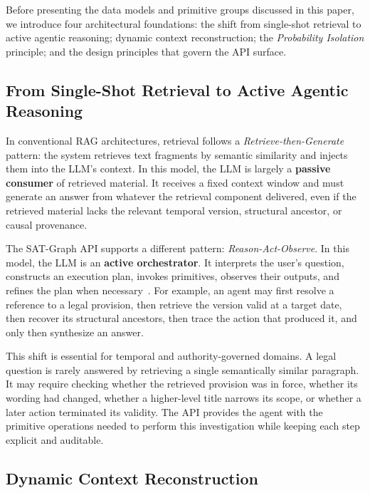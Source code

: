 \documentclass[11pt]{article}
\begin{document}
Before presenting the data models and primitive groups discussed in this paper, we introduce four architectural foundations: the shift from single-shot retrieval to active agentic reasoning; dynamic context reconstruction; the \textit{Probability Isolation} principle; and the design principles that govern the API surface.

\subsection{From Single-Shot Retrieval to Active Agentic Reasoning}
\label{subsec:paradigm_shift}

In conventional RAG architectures, retrieval follows a \textit{Retrieve-then-Generate} pattern: the system retrieves text fragments by semantic similarity and injects them into the LLM's context. In this model, the LLM is largely a \textbf{passive consumer} of retrieved material. It receives a fixed context window and must generate an answer from whatever the retrieval component delivered, even if the retrieved material lacks the relevant temporal version, structural ancestor, or causal provenance.

The SAT-Graph API supports a different pattern: \textit{Reason-Act-Observe}. In this model, the LLM is an \textbf{active orchestrator}. It interprets the user's question, constructs an execution plan, invokes primitives, observes their outputs, and refines the plan when necessary~\cite{yao2023react}. For example, an agent may first resolve a reference to a legal provision, then retrieve the version valid at a target date, then recover its structural ancestors, then trace the action that produced it, and only then synthesize an answer.

This shift is essential for temporal and authority-governed domains. A legal question is rarely answered by retrieving a single semantically similar paragraph. It may require checking whether the retrieved provision was in force, whether its wording had changed, whether a higher-level title narrows its scope, or whether a later action terminated its validity. The API provides the agent with the primitive operations needed to perform this investigation while keeping each step explicit and auditable.

\subsection{Dynamic Context Reconstruction}
\label{subsec:context_reconstruction}
\end{document}
